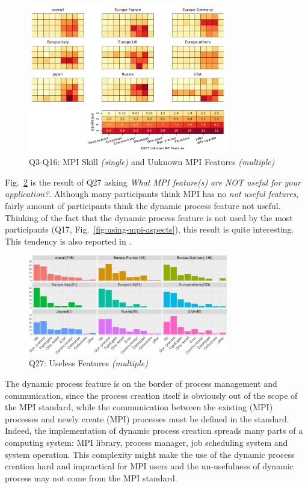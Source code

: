 \documentclass[preprint,5p,times]{elsarticle}
\def\myquote#1{{\it #1}}
\begin{document}
\begin{figure}[htb]
  \begin{center}
    \includegraphics[width=8.7cm]{Figs/Q3-Q16.pdf}
    \caption{Q3-Q16: MPI Skill {\it(single)} and Unknown MPI Features {\it(multiple)}}
    \label{fig:skill-and-aspects}
  \end{center}
\end{figure}

Fig.~\ref{fig:useless-features} is the result of Q27 asking \myquote{What MPI
feature(s) are NOT useful for your application?}. Although many
participants think MPI has no {\it not useful features}, fairly amount of
participants think the dynamic process feature not useful. Thinking
of the fact that the dynamic process feature is not used by the most
participants (Q17, Fig.~\ref{fig:using-mpi-aspects}), this result is
quite interesting.
This tendency is also reported in \cite{10.1145/3295500.3356176}.

\begin{figure}[htb]
  \begin{center}
    \includegraphics[width=8.7cm]{R-scripts/Q27.pdf}
    \caption{Q27: Useless Features {\it(multiple)}}
    \label{fig:useless-features}
  \end{center}
\end{figure}

The dynamic process feature is on the
border of process management and communication, since the process
creation itself is obviously out of the scope of the MPI standard,
while the communication between the existing (MPI) processes and newly
create (MPI) processes must be defined in the standard. Indeed, the
implementation of dynamic process creation spreads many parts of a
computing system: MPI library, process manager, job scheduling system
and system operation. This complexity might make the use of the
dynamic process creation hard and impractical for MPI users and the
un-usefulness of dynamic process may not come from the MPI standard.
\end{document}

